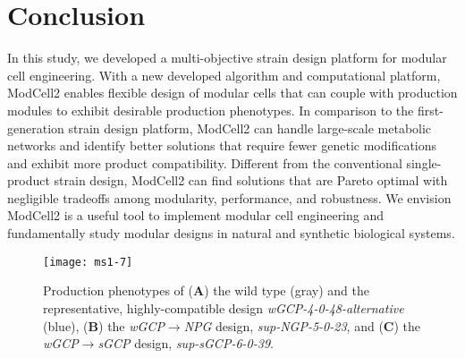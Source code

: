 \section{Conclusion}

In this study, we developed a multi-objective strain design platform for modular cell engineering.
With a new developed algorithm and computational platform, ModCell2 enables flexible design of modular cells that can couple with production modules to exhibit desirable production phenotypes.
In comparison to the first-generation strain design platform, ModCell2 can handle large-scale metabolic networks and identify better solutions that require fewer genetic modifications and exhibit more product compatibility.
Different from the conventional single-product strain design, ModCell2 can find solutions that are Pareto optimal with negligible tradeoffs among modularity, performance, and robustness.
We envision ModCell2 is a useful tool to implement modular cell engineering and fundamentally study modular designs in natural and synthetic biological systems.

\begin{figure}[p]
  \centering
  \texttt{[image: ms1-7]}
    \caption[Production phenotypes of proposed designs]{
Production phenotypes of (\textbf{A}) the wild type
(gray) and the representative, highly-compatible design
\emph{wGCP-4-0-48-alternative} (blue), (\textbf{B}) the
\emph{wGCP}$\rightarrow$\emph{NPG} design, \emph{sup-NGP-5-0-23}, and (\textbf{C})
the \emph{wGCP}$\rightarrow$\emph{sGCP} design, \emph{sup-sGCP-6-0-39}.
    }
    \label{fig:ms1-fig7}
\end{figure}

%
%


